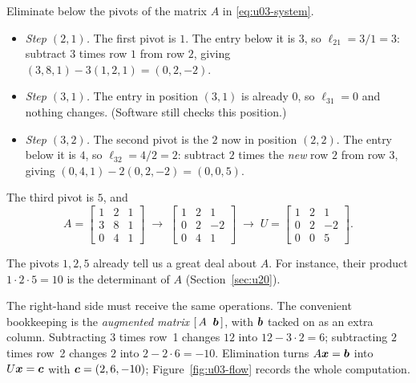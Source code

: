 \begin{example}\label{ex:u03-forward}
Eliminate below the pivots of the matrix $A$ in \eqref{eq:u03-system}.
\begin{itemize}
  \item \emph{Step $(2,1)$.} The first pivot is $1$. The entry below it is $3$, so
    $\ell_{21}=3/1=3$: subtract $3$ times row $1$ from row $2$, giving
    $(3,8,1)-3(1,2,1)=(0,2,-2)$.
  \item \emph{Step $(3,1)$.} The entry in position $(3,1)$ is already $0$, so
    $\ell_{31}=0$ and nothing changes. (Software still checks this position.)
  \item \emph{Step $(3,2)$.} The second pivot is the $2$ now in position $(2,2)$. The entry
    below it is $4$, so $\ell_{32}=4/2=2$: subtract $2$ times the \emph{new} row $2$ from
    row $3$, giving $(0,4,1)-2(0,2,-2)=(0,0,5)$.
\end{itemize}
The third pivot is $5$, and
\[
  A=\begin{bmatrix} 1 & 2 & 1\\ 3 & 8 & 1\\ 0 & 4 & 1\end{bmatrix}
  \;\longrightarrow\;
  \begin{bmatrix} 1 & 2 & 1\\ 0 & 2 & -2\\ 0 & 4 & 1\end{bmatrix}
  \;\longrightarrow\;
  U=\begin{bmatrix} 1 & 2 & 1\\ 0 & 2 & -2\\ 0 & 0 & 5\end{bmatrix}.
\]
\end{example}
The pivots $1,2,5$ already tell us a great deal about $A$. For instance, their product
$1\cdot2\cdot5=10$ is the determinant of $A$ (Section~\ref{sec:u20}).

The right-hand side must receive the same operations. The convenient bookkeeping is the
\emph{augmented matrix} $[\,A\;\;\boldsymbol{b}\,]$, with $\boldsymbol{b}$ tacked on as an extra column.
Subtracting $3$ times row~1 changes $12$ into $12-3\cdot2=6$; subtracting $2$ times row~2
changes $2$ into $2-2\cdot6=-10$. Elimination turns $A\boldsymbol{x}=\boldsymbol{b}$ into $U\boldsymbol{x}=\boldsymbol{c}$
with $\boldsymbol{c}=(2,6,-10)$; Figure~\ref{fig:u03-flow} records the whole computation.


